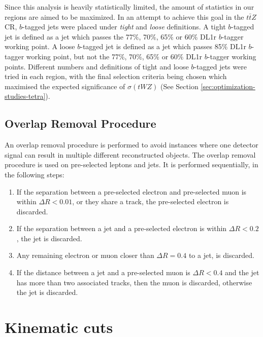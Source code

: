 Since this analysis is heavily statistically limited, the amount of statistics in our regions are aimed to be maximized. In an attempt to achieve this goal in the $t\bar{t}Z$ CR, $b$-tagged jets were placed under \textit{tight} and \textit{loose} definitions. A tight $b$-tagged jet is defined as a jet which passes the 77$\%$, 70$\%$, 65$\%$ or 60$\%$ DL1r $b$-tagger working point. A loose $b$-tagged jet is defined as a jet which passes 85$\%$ DL1r $b$-tagger working point, but not the 77$\%$, 70$\%$, 65$\%$ or 60$\%$ DL1r $b$-tagger working points. Different numbers and definitions of tight and loose $b$-tagged jets were tried in each region, with the final selection criteria being chosen which maximised the expected significance of $\sigma(tWZ)$ (See Section \ref{sec:optimization-studies-tetra}).

\subsection{Overlap Removal Procedure}
\label{sec:overlap-removal-procedure}

An overlap removal procedure is performed to avoid instances where one detector signal can result in multiple different reconstructed objects. The overlap removal procedure is used on pre-selected leptons and jets. It is performed sequentially, in the following steps:

\begin{enumerate}
\item If the separation between a pre-selected electron and pre-selected muon is within $\Delta R < 0.01$, or they share a track, the pre-selected electron is discarded.
\item If the separation between a jet and a pre-selected electron is within $\Delta R < 0.2$, the jet is discarded.
\item Any remaining electron or muon closer than $\Delta R = 0.4$ to a jet, is discarded.
\item If the distance between a jet and a pre-selected muon is $\Delta R < 0.4$ and the jet has more than two associated tracks, then the muon is discarded, otherwise the jet is discarded.
\end{enumerate}


\section{Kinematic cuts}

